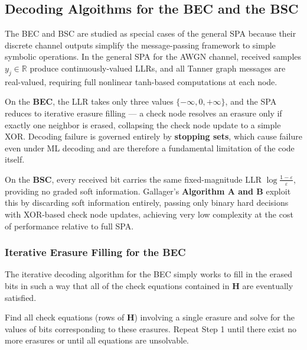 \documentclass[11pt]{article}
\begin{document}
\subsection{Decoding Algoithms for the BEC and the BSC}

The BEC and BSC are studied as special cases of the general SPA because their discrete channel outputs simplify the message-passing framework to simple symbolic operations. In the general SPA for the AWGN channel, received samples $y_j \in \mathbb{R}$ produce continuously-valued LLRs, and all Tanner graph messages are real-valued, requiring full nonlinear tanh-based computations at each node.

On the \textbf{BEC}, the LLR takes only three values $\{-\infty, 0, +\infty\}$, and the SPA reduces to iterative erasure filling --- a check node resolves an erasure only if exactly one neighbor is erased, collapsing the check node update to a simple XOR. Decoding failure is governed entirely by \textbf{stopping sets}, which cause failure even under ML decoding and are therefore a fundamental limitation of the code itself.

On the \textbf{BSC}, every received bit carries the same fixed-magnitude LLR $\log\frac{1-\varepsilon}{\varepsilon}$, providing no graded soft information. Gallager's \textbf{Algorithm A and B} exploit this by discarding soft information entirely, passing only binary hard decisions with XOR-based check node updates, achieving very low complexity at the cost of performance relative to full SPA.


\subsubsection{Iterative Erasure Filling for the BEC}
The iterative decoding algorithm for the BEC simply works to fill in the erased bits in such a way that all of the check equations contained in \textbf{H} are eventually satisfied.

\begin{algorithm}[H]
\caption{Iterative Erasure Decoding Algorithm}
\begin{algorithmic}[1]
\State Find all check equations (rows of \textbf{H}) involving a single erasure and solve for the values of bits corresponding to these erasures.
\State Repeat Step 1 until there exist no more erasures or until all equations are unsolvable.
\end{algorithmic}
\end{algorithm}
\end{document}
